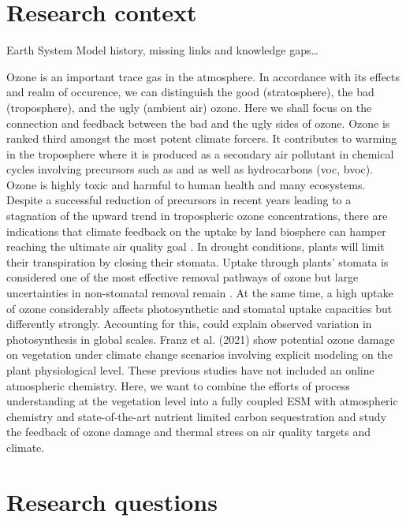 \documentclass[11pt, a4paper, oneside, article]{memoir}
\newcommand{\pcite}[1]{\parencite{#1}}
\begin{document}


\chapter{Research context}
Earth System Model history, missing links and knowledge gaps…

Ozone is an important trace gas in the atmosphere. In accordance with its effects and realm of occurence, we can distinguish the good (stratosphere), the bad (troposphere), and the ugly (ambient air) ozone. Here we shall focus on the connection and feedback between the bad and the ugly sides of ozone. Ozone is ranked third amongst the most potent climate forcers. It contributes to warming in the troposphere where it is produced as a secondary air pollutant in chemical cycles involving precursors such as  and  as well as hydrocarbons (\gls{voc}, \gls{bvoc}). Ozone is highly toxic and harmful to human health and many ecosystems. Despite a successful reduction of precursors in recent years leading to a stagnation of the upward trend in tropospheric ozone concentrations, there are indications that climate feedback on the uptake by land biosphere can hamper reaching the ultimate air quality goal \pcite{NCC:Lin2020}. In drought conditions, plants will limit their transpiration by closing their stomata. Uptake through plants’ stomata is considered one of the most effective removal pathways of ozone but large uncertainties in non-stomatal removal remain \pcite{RG:Clifton2020}. At the same time, a high uptake of ozone considerably affects photosynthetic and stomatal uptake capacities but differently strongly. Accounting for this, \cite{BGS:Lombardozzi2013} could explain observed variation in photosynthesis in global scales. Franz et al. (2021) show potential ozone damage on vegetation under climate change scenarios involving explicit modeling on the plant physiological level. These previous studies have not included an online atmospheric chemistry. Here, we want to combine the efforts of process understanding at the vegetation level into a fully coupled ESM with atmospheric chemistry and state-of-the-art nutrient limited carbon sequestration and study the feedback of ozone damage and thermal stress on air quality targets and climate.

\chapter{Research questions}
\end{document}
